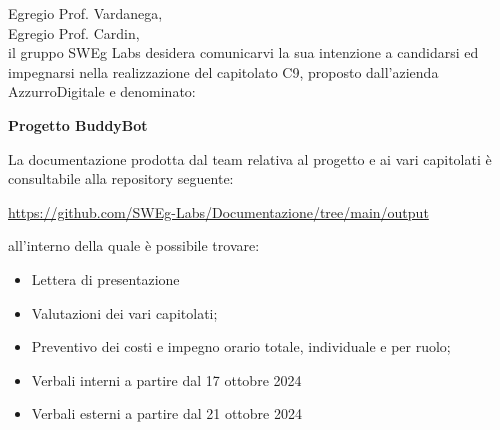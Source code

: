 Egregio Prof. Vardanega, \\
Egregio Prof. Cardin, \\
\sloppy
il gruppo SWEg Labs desidera comunicarvi la sua intenzione a candidarsi ed impegnarsi nella realizzazione del capitolato C9, proposto dall'azienda 
\mbox{AzzurroDigitale} e denominato:
\fussy
\begin{center}
    \textbf{Progetto BuddyBot} \\
\end{center}
La documentazione prodotta dal team relativa al progetto e ai vari capitolati è consultabile alla repository seguente:
\begin{center}
    \url{https://github.com/SWEg-Labs/Documentazione/tree/main/output}
\end{center}
all'interno della quale è possibile trovare:
\begin{itemize}
    \item Lettera di presentazione
    \item Valutazioni dei vari capitolati;
    \item Preventivo dei costi e impegno orario totale, individuale e per ruolo;
    \item Verbali interni a partire dal 17 ottobre 2024
    \item Verbali esterni a partire dal 21 ottobre 2024
\end{itemize}

